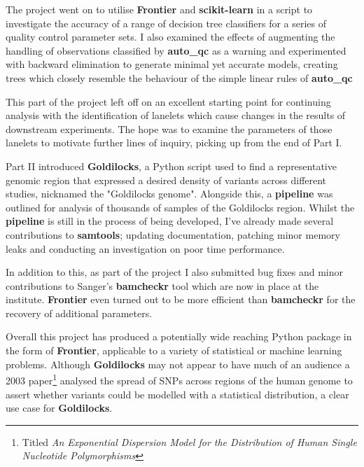 The project went on to utilise \textbf{Frontier} and \textbf{scikit-learn} in a
script to investigate the accuracy of a range of decision tree classifiers for a
series of quality control parameter sets. I also examined the effects of
augmenting the handling of observations classified by \textbf{auto\_qc} as a
warning and experimented with backward elimination to generate minimal yet
accurate models, creating trees which closely resemble the behaviour of the
simple linear rules of \textbf{auto\_qc}

This part of the project left off on an excellent starting point for continuing
analysis with the identification of lanelets which cause changes in the results
of downstream experiments. The hope was to examine the parameters of those
lanelets to motivate further lines of inquiry, picking up from the end of Part
I.

Part II introduced \textbf{Goldilocks}, a Python script used to find a
representative genomic region that expressed a desired density of variants
across different studies, nicknamed the "Goldilocks genome". Alongside this, a
\textbf{pipeline} was outlined for analysis of thousands of samples of the
Goldilocks region. Whilst the \textbf{pipeline} is still in the process of being
developed, I've already made several contributions to \textbf{samtools};
updating documentation, patching minor memory leaks and conducting an
investigation on poor time performance.

In addition to this, as part of the project I also submitted bug fixes and
minor contributions to Sanger's \textbf{bamcheckr} tool which are now in place
at the institute. \textbf{Frontier} even turned out to be more efficient than
\textbf{bamcheckr} for the recovery of additional parameters.


Overall this project has produced a potentially wide reaching Python package in
the form of \textbf{Frontier}, applicable to a variety of statistical or machine
learning problems. Although \textbf{Goldilocks} may not appear to have much of
an audience a 2003 paper\citep{kendal2003exponential}\footnote{Titled \textit{An Exponential
Dispersion Model for the Distribution of Human Single Nucleotide
Polymorphisms}\citep{kendal2003exponential}} analysed the spread of SNPs
across regions of the human genome to assert whether variants could be modelled
with a statistical distribution, a clear use case for \textbf{Goldilocks}.







